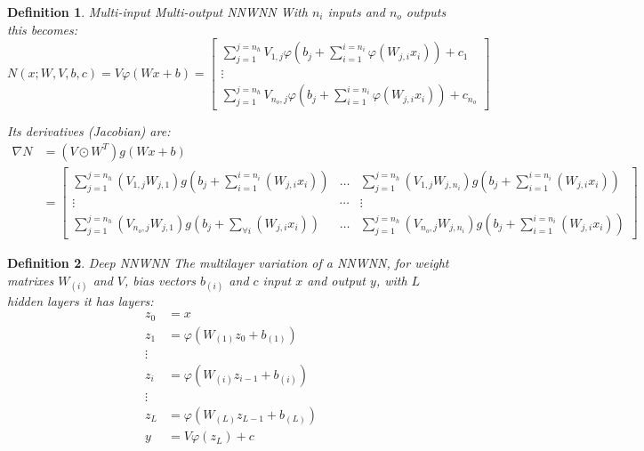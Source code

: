 \documentclass{article} %
\newtheorem{defn}{Definition}
\begin{document}
\begin{defn}{Multi-input Multi-output NNWNN}
	With $n_i$ inputs and $n_o$ outputs this becomes:
	\begin{equation}
	N(x;W,V,b,c)=V\varphi(Wx+b)=\left[\begin{array}{c}
	{\displaystyle \sum_{j=1}^{j=n_{h}}}V_{1,j}\varphi\left(b_{j}+\sum_{i=1}^{i=n_{i}}\varphi\left(W_{j,i}x_{i}\right)\right) + c_1\\
	\vdots\\
	{\displaystyle \sum_{j=1}^{j=n_{h}}}V_{n_{o},j}\varphi\left(b_{j}+\sum_{i=1}^{i=n_{i}}\varphi\left(W_{j,i}x_{i}\right)\right) +c_{n_o}
	\end{array}\right]
	\end{equation}
	
	Its derivatives (Jacobian) are:
	{\scriptsize
	\begin{align}
	\nabla N&=\left(V\odot W^{T}\right)g(Wx+b)\\
	&=\left[\begin{array}{ccc}
	{\displaystyle \sum_{j=1}^{j=n_{h}}}\left(V_{1,j}W_{j,1}\right)g(b_{j}+\sum_{i=1}^{i=n_{i}}\left(W_{j,i}x_{i}\right)) & \ldots & {\displaystyle \sum_{j=1}^{j=n_{h}}}\left(V_{1,j}W_{j,n_{i}}\right)g(b_{j}+\sum_{i=1}^{i=n_{i}}\left(W_{j,i}x_{i}\right))\\
	\vdots & \cdots & \vdots\\
	{\displaystyle \sum_{j=1}^{j=n_{h}}}\left(V_{n_{o},j}W_{j,1}\right)g(b_{j}+\sum_{\forall i}\left(W_{j,i}x_{i}\right)) & \ldots & {\displaystyle \sum_{j=1}^{j=n_{h}}}\left(V_{n_{o},j}W_{j,n_{i}}\right)g(b_{j}+\sum_{i=1}^{i=n_{i}}\left(W_{j,i}x_{i}\right))
	\end{array}\right]
	\end{align}
	}
\end{defn}

\begin{defn}{Deep NNWNN}
	The multilayer variation of a NNWNN,
	for weight matrixes $W_{(i)}$ and $V$, bias vectors $b_{(i)}$ and $c$
	input $x$ and output $y$, with $L$ hidden layers
	it has layers:
	\begin{align}
	z_0 &= x \\
	z_1 &= \varphi(W_{(1)}z_0+b_{(1)})\\
	\vdots\\
	z_i &= \varphi(W_{(i)}z_{i-1}+b_{(i)})\\
	\vdots\\
	z_L &= \varphi(W_{(L)}z_{L-1}+b_{(L)})\\
	y  &= V\varphi(z_L)+c	
	\end{align}
	
\end{defn}
\end{document}
